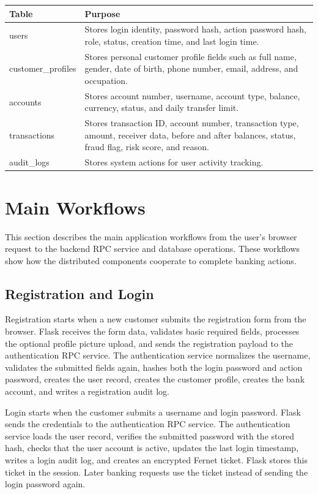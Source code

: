 \documentclass[12pt,a4paper]{article}
\newcommand{\sectionbreakguard}{\Needspace{8\baselineskip}}
\newcommand{\subsectionbreakguard}{\Needspace{5\baselineskip}}
\begin{document}
\begin{longtable}{|p{3.8cm}|p{10.2cm}|}
\hline
\textbf{Table} & \textbf{Purpose} \\
\hline
users & Stores login identity, password hash, action password hash, role, status, creation time, and last login time. \\
\hline
customer\_profiles & Stores personal customer profile fields such as full name, gender, date of birth, phone number, email, address, and occupation. \\
\hline
accounts & Stores account number, username, account type, balance, currency, status, and daily transfer limit. \\
\hline
transactions & Stores transaction ID, account number, transaction type, amount, receiver data, before and after balances, status, fraud flag, risk score, and reason. \\
\hline
audit\_logs & Stores system actions for user activity tracking. \\
\hline
\end{longtable}

\sectionbreakguard
\section{Main Workflows}

This section describes the main application workflows from the user's browser request to the backend RPC service and database operations. These workflows show how the distributed components cooperate to complete banking actions.

\subsectionbreakguard
\subsection{Registration and Login}

Registration starts when a new customer submits the registration form from the browser. Flask receives the form data, validates basic required fields, processes the optional profile picture upload, and sends the registration payload to the authentication RPC service. The authentication service normalizes the username, validates the submitted fields again, hashes both the login password and action password, creates the user record, creates the customer profile, creates the bank account, and writes a registration audit log.

Login starts when the customer submits a username and login password. Flask sends the credentials to the authentication RPC service. The authentication service loads the user record, verifies the submitted password with the stored hash, checks that the user account is active, updates the last login timestamp, writes a login audit log, and creates an encrypted Fernet ticket. Flask stores this ticket in the session. Later banking requests use the ticket instead of sending the login password again.
\end{document}

